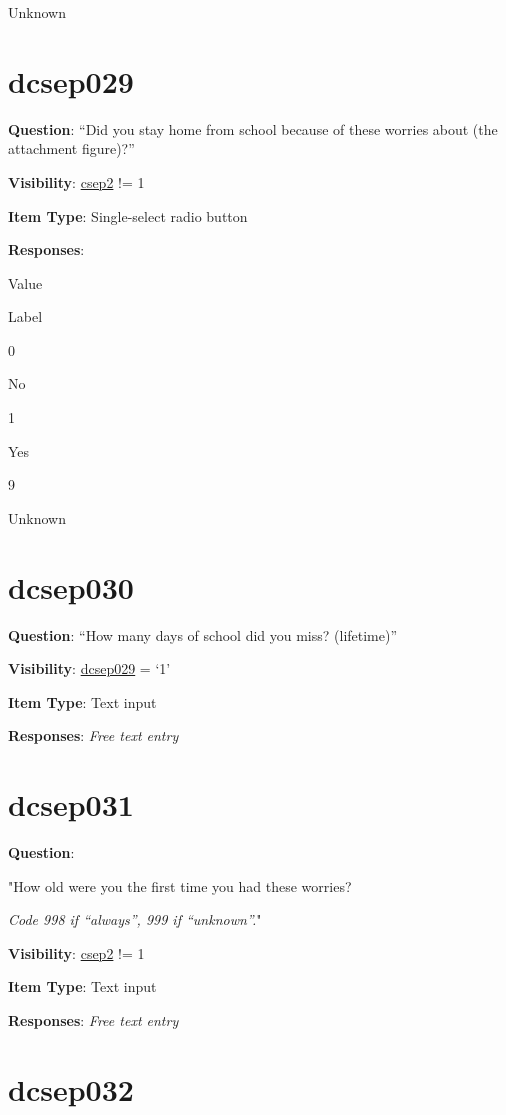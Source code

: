 \documentclass[]{book}
\begin{document}
Unknown

\hypertarget{dcsep029}{%
\section{dcsep029}\label{dcsep029}}

\textbf{Question}: ``Did you stay home from school because of these worries about (the attachment figure)?''

\textbf{Visibility}: \protect\hyperlink{csep2}{csep2} != 1

\textbf{Item Type}: Single-select radio button

\textbf{Responses}:

Value

Label

0

No

1

Yes

9

Unknown

\hypertarget{dcsep030}{%
\section{dcsep030}\label{dcsep030}}

\textbf{Question}: ``How many days of school did you miss? (lifetime)''

\textbf{Visibility}: \protect\hyperlink{dcsep029}{dcsep029} = `1'

\textbf{Item Type}: Text input

\textbf{Responses}: \emph{Free text entry}

\hypertarget{dcsep031}{%
\section{dcsep031}\label{dcsep031}}

\textbf{Question}:

"How old were you the first time you had these worries?

\emph{Code 998 if ``always'', 999 if ``unknown''.}"

\textbf{Visibility}: \protect\hyperlink{csep2}{csep2} != 1

\textbf{Item Type}: Text input

\textbf{Responses}: \emph{Free text entry}

\hypertarget{dcsep032}{%
\section{dcsep032}\label{dcsep032}}
\end{document}
